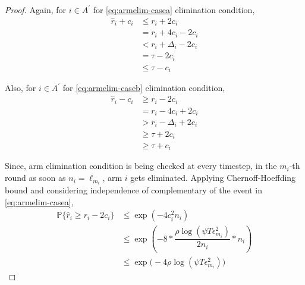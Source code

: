 \begin{proof}
Again, for ${i} \in A^{'}$ for \ref{eq:armelim-casea} elimination condition, 
\begin{align*}
\hat{r}_{i} + c_{i}&\leq r_{i} + 2c_{i} \\
&= r_{i} + 4c_{i} - 2c_{i} \\
&< r_{i} + \Delta_{i} - 2c_{i}\\
&= \tau -2c_{i} \\
&\leq \tau - c_{i}
\end{align*}

Also, for ${i} \in A^{'}$ for \ref{eq:armelim-caseb} elimination condition, 
\begin{align*}
\hat{r}_{i} - c_{i}&\geq r_{i} - 2c_{i} \\
&= r_{i} - 4c_{i} + 2c_{i} \\
&> r_{i} - \Delta_{i} + 2c_{i}\\
&\geq \tau + 2c_{i} \\
&\geq \tau + c_{i}
\end{align*}

Since, arm elimination condition is being checked at every timestep, in the $m_{i}$-th round as soon as $n_{i}=\ell_{m_{i}}$, arm $i$ gets eliminated. Applying Chernoff-Hoeffding bound and considering independence of complementary of the event in \ref{eq:armelim-casea},
  \begin{align*}
\mathbb{P}\lbrace\hat{r}_{i}\geq r_{i} - 2c_{i}\rbrace &\leq \exp(-4 c_{i}^{2}n_{i})\\
&\leq \exp(-8 * \dfrac{\rho\log (\psi T\epsilon_{m_{i}}^{2})}{2 n_{i}} *n_{i})\\
&\leq \exp\big(-4\rho\log (\psi T\epsilon_{m_{i}}^{2})\big)
  \end{align*}
  


\end{proof}
